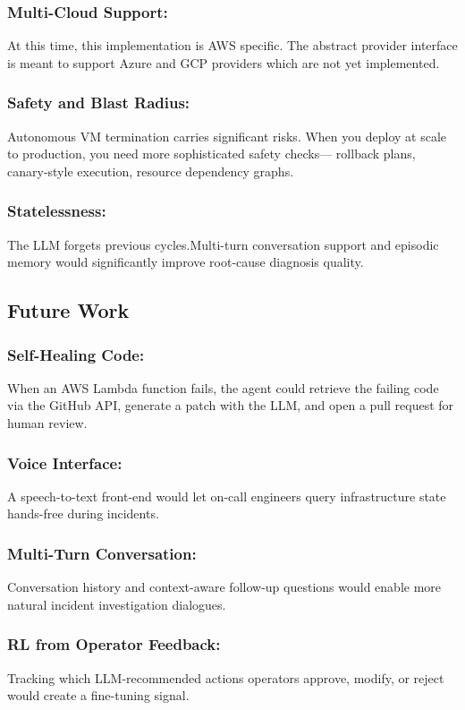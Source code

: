 \documentclass{ieeeaccess}
\begin{document}
\subsubsection{Multi-Cloud Support:} At this time, this implementation is AWS specific. The abstract provider interface is meant to support Azure and GCP providers which are not yet implemented.

\subsubsection{Safety and Blast Radius:}Autonomous VM termination carries significant risks. When you deploy at scale to production, you need more sophisticated safety checks— rollback plans, canary-style execution, resource dependency graphs.

\subsubsection{Statelessness:}The LLM forgets previous cycles.Multi-turn conversation support and episodic memory would significantly improve root-cause
diagnosis quality.

\subsection{Future Work}

\subsubsection{Self-Healing Code:} When an AWS Lambda function fails, the agent could
retrieve the failing code via the GitHub API, generate a patch with the LLM,
and open a pull request for human review.

\subsubsection{Voice Interface:} A speech-to-text front-end would let on-call
engineers query infrastructure state hands-free during incidents.

\subsubsection{Multi-Turn Conversation:} Conversation history and context-aware
follow-up questions would enable more natural incident investigation dialogues.

\subsubsection{RL from Operator Feedback:} Tracking which LLM-recommended actions
operators approve, modify, or reject would create a fine-tuning signal.
\end{document}
